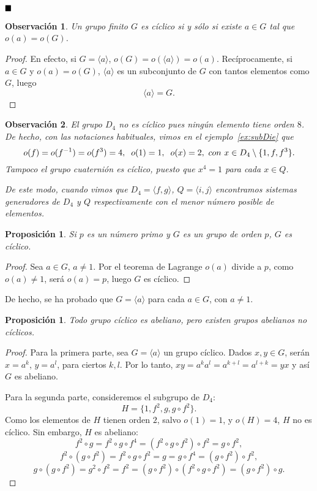 \documentclass[12pt]{article}
\newtheorem{proposition}[theorem]{Proposición}
\newtheorem{observation}{Observación}[theorem]
\begin{document}
$\hfill \blacksquare$

\begin{observation}Un grupo finito $G$ es cíclico si y sólo si existe $a \in G$ tal que $o(a) = o(G)$.
\end{observation}
\begin{proof}
En efecto, si $G = \langle a \rangle$, $o(G) = o(\langle a \rangle) = o(a)$. Recíprocamente, si $a \in G$ y $o(a) = o(G)$, $\langle a \rangle$ es un subconjunto de $G$ con tantos elementos como $G$, luego $$\langle a \rangle = G.$$

\end{proof}

\begin{observation}El grupo $D_4$ no es cíclico pues ningún elemento tiene orden $8$. De hecho, con las notaciones habituales, vimos en el ejemplo~\ref{ex:subDie} que $$o(f) = o(f^{-1}) = o(f^3) = 4,\hspace{0.2cm} o(1)=1,\hspace{0.2cm} o(x) = 2,~con~ x \in D_4 \setminus \lbrace 1, f, f^3 \rbrace.$$
Tampoco el grupo cuaternión es cíclico, puesto que $x^4= 1$ para cada $x \in Q$.

De este modo, cuando vimos que $D_4 = \langle f,g \rangle$, $Q = \langle i,j \rangle$ encontramos sistemas generadores de $D_4$ y $Q$ respectivamente con el menor número posible de elementos.
\end{observation}

\begin{proposition}Si $p$ es un número primo y $G$ es un grupo de orden $p$, $G$ es cíclico.
\end{proposition}
\begin{proof}
Sea $a\in G$, $a \neq 1$. Por el teorema de Lagrange $o(a)$ divide a $p$, como $o(a) \neq 1$, será $o(a) = p$, luego $G$ es cíclico.

\end{proof}

De hecho, se ha probado que $G = \langle a \rangle$ para cada $a \in G$, con $a \neq 1$.

\begin{proposition}Todo grupo cíclico es abeliano, pero existen grupos abelianos no cíclicos.
\end{proposition}
\begin{proof}
Para la primera parte, sea $G = \langle a \rangle$ un grupo cíclico. Dados $x,y \in G$, serán $x = a^k$, $y = a^l$, para ciertos $k,l$. Por lo tanto, $xy = a^ka^l = a^{k+l} = a^{l+k} = yx$ y así $G$ es abeliano.

Para la segunda parte, consideremos el subgrupo de $D_4$: $$H = \lbrace 1,f^2, g, g \circ f^2 \rbrace.$$ Como los elementos de $H$ tienen orden $2$, salvo $o(1) = 1$, y $o(H) = 4$, $H$ no es cíclico. Sin embargo, $H$ es abeliano: $$f^2 \circ g  = f^2 \circ g \circ f^4 = (f^2 \circ g \circ f^2) \circ f^2 = g \circ f^2,$$ $$f^2 \circ (g \circ f^2) = f^2 \circ g \circ f^2 = g = g \circ f^4 = (g \circ f^2) \circ f^2,$$ $$g \circ (g \circ f^2) = g^2 \circ f^2 = f^2 = (g \circ f^2) \circ (f^2 \circ g \circ f^2) = (g \circ f^2) \circ g.$$

\end{proof}
\end{document}
